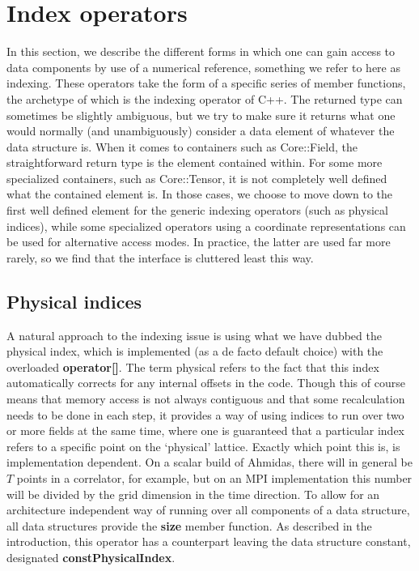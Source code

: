 \documentclass[a4paper,12pt,twoside]{article}
\begin{document}
\section{Index operators}
In this section, we describe the different forms in which one can gain access to data components by use of a numerical reference, something we refer to here as indexing. These operators take the form of a specific series of member functions, the archetype of which is the indexing operator of C++. The returned type can sometimes be slightly ambiguous, but we try to make sure it returns what one would normally (and unambiguously) consider a data element of whatever the data structure is. When it comes to containers such as Core::Field, the straightforward return type is the element contained within. For some more specialized containers, such as Core::Tensor, it is not completely well defined what the contained element is. In those cases, we choose to move down to the first well defined element for the generic indexing operators (such as physical indices), while some specialized operators using a coordinate representations can be used for alternative access modes. In practice, the latter are used far more rarely, so we find that the interface is cluttered least this way.


\subsection{Physical indices}
A natural approach to the indexing issue is using what we have dubbed the physical index, which is implemented (as a de facto default choice) with the overloaded \textbf{operator[]}. The term physical refers to the fact that this index automatically corrects for any internal offsets in the code. Though this of course means that memory access is not always contiguous and that some recalculation needs to be done in each step, it provides a way of using indices to run over two or more fields at the same time, where one is guaranteed that a particular index refers to a specific point on the `physical' lattice. Exactly which point this is, is implementation dependent. On a scalar build of Ahmidas, there will in general be $T$ points in a correlator, for example, but on an MPI implementation this number will be divided by the grid dimension in the time direction. To allow for an architecture independent way of running over all components of a data structure, all data structures provide the \textbf{size} member function. As described in the introduction, this operator has a counterpart leaving the data structure constant, designated \textbf{constPhysicalIndex}.
\end{document}
